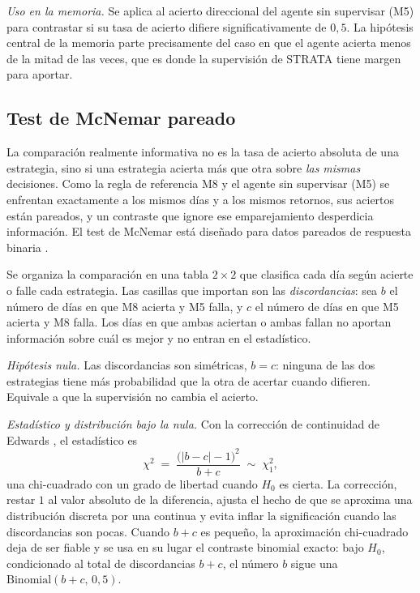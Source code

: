 \emph{Uso en la memoria.} Se aplica al acierto direccional del agente sin supervisar (M5) para contrastar si su tasa de acierto difiere significativamente de $0{,}5$. La hipótesis central de la memoria parte precisamente del caso en que el agente acierta menos de la mitad de las veces, que es donde la supervisión de STRATA tiene margen para aportar.

\subsection{Test de McNemar pareado}
\label{sec:tests-mcnemar}

La comparación realmente informativa no es la tasa de acierto absoluta de una estrategia, sino si una estrategia acierta más que otra sobre \emph{las mismas} decisiones. Como la regla de referencia M8 y el agente sin supervisar (M5) se enfrentan exactamente a los mismos días y a los mismos retornos, sus aciertos están pareados, y un contraste que ignore ese emparejamiento desperdicia información. El test de McNemar está diseñado para datos pareados de respuesta binaria \cite{mcnemar1947}.

Se organiza la comparación en una tabla $2\times 2$ que clasifica cada día según acierte o falle cada estrategia. Las casillas que importan son las \emph{discordancias}: sea $b$ el número de días en que M8 acierta y M5 falla, y $c$ el número de días en que M5 acierta y M8 falla. Los días en que ambas aciertan o ambas fallan no aportan información sobre cuál es mejor y no entran en el estadístico.

\emph{Hipótesis nula.} Las discordancias son simétricas, $b = c$: ninguna de las dos estrategias tiene más probabilidad que la otra de acertar cuando difieren. Equivale a que la supervisión no cambia el acierto.

\emph{Estadístico y distribución bajo la nula.} Con la corrección de continuidad de Edwards \cite{edwards1948}, el estadístico es
\[
\chi^2 \;=\; \frac{\big(|b - c| - 1\big)^2}{b + c} \;\sim\; \chi^2_1,
\]
una chi-cuadrado con un grado de libertad cuando $H_0$ es cierta. La corrección, restar $1$ al valor absoluto de la diferencia, ajusta el hecho de que se aproxima una distribución discreta por una continua y evita inflar la significación cuando las discordancias son pocas. Cuando $b + c$ es pequeño, la aproximación chi-cuadrado deja de ser fiable y se usa en su lugar el contraste binomial exacto: bajo $H_0$, condicionado al total de discordancias $b+c$, el número $b$ sigue una $\mathrm{Binomial}(b+c,\, 0{,}5)$.

